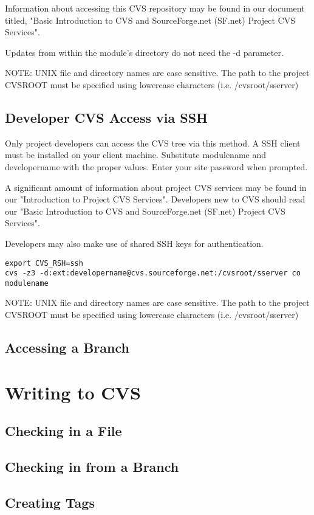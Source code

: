 Information about accessing this CVS repository may be found in our document titled, 
"Basic Introduction to CVS and SourceForge.net (SF.net) Project CVS Services".

Updates from within the module's directory do not need the -d parameter.

NOTE: UNIX file and directory names are case sensitive. 
The path to the project CVSROOT must be specified using lowercase characters (i.e. /cvsroot/sserver)


\subsection{Developer CVS Access via SSH}

Only project developers can access the CVS tree via this method. 
A SSH client must be installed on your client machine. Substitute modulename 
and developername with the proper values. Enter your site password when prompted.

A significant amount of information about project CVS services may be found in our 
"Introduction to Project CVS Services". Developers new to CVS should read our 
"Basic Introduction to CVS and SourceForge.net (SF.net) Project CVS Services".

Developers may also make use of shared SSH keys for authentication.

\begin{verbatim}
export CVS_RSH=ssh
cvs -z3 -d:ext:developername@cvs.sourceforge.net:/cvsroot/sserver co modulename
\end{verbatim}

NOTE: UNIX file and directory names are case sensitive. 
The path to the project CVSROOT must be specified using lowercase characters (i.e. /cvsroot/sserver)

\subsection{Accessing a Branch}
\section{Writing to CVS}
\subsection{Checking in a File}
\subsection{Checking in from a Branch}
\subsection{Creating Tags}

